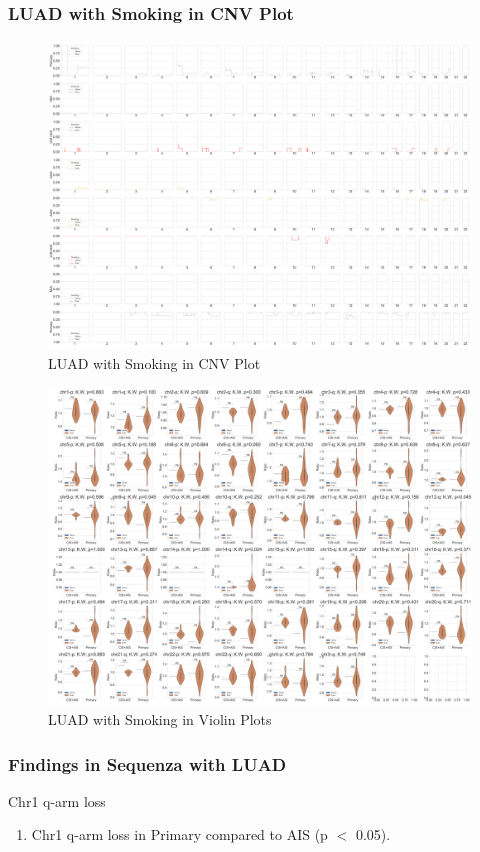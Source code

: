 \documentclass{beamer}
\begin{document}
    \begin{frame}[allowframebreaks]
        \frametitle{LUAD with Smoking in CNV Plot}

        \begin{figure}
            \includegraphics[width=0.6 \linewidth]{figures/Sequenza/BWA-simple-ADC.Smoking.pdf}
            \caption{LUAD with Smoking in CNV Plot}
        \end{figure}

        \begin{figure}
            \includegraphics[width=0.8 \linewidth]{figures/Sequenza/BWA-violin-ADC.Smoking.pdf}
            \caption{LUAD with Smoking in Violin Plots}
        \end{figure}
    \end{frame}

    \begin{frame}[allowframebreaks]
        \frametitle{Findings in Sequenza with LUAD}

        \begin{block}{Chr1 q-arm loss}
            \begin{enumerate}
                \item Chr1 q-arm loss in Primary compared to AIS (p $<$ 0.05).
            \end{enumerate}

            \begin{table}
                \caption{CGC Tier1 genes in Chr1 q-arm}
                \resizebox{\linewidth}{!}
                {}
            \end{table}
        \end{block}
    \end{frame}
\end{document}

